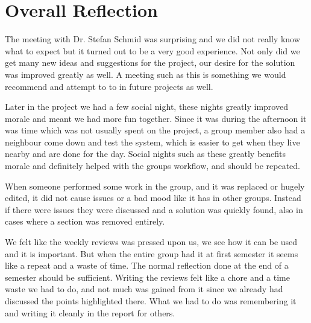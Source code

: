\section{Overall Reflection}
The meeting with Dr. Stefan Schmid was surprising and we did
not really know what to expect but it turned out to be a very good experience. Not only
did we get many new ideas and suggestions for the project, our desire for the
solution was improved greatly as well. A meeting such as this is something we
would recommend and attempt to to in future projects as well.

Later in the project we had a few social night, these nights greatly improved
morale and meant we had more fun together. Since it was during the afternoon it
was time which was not usually spent on the project, a group member also had a
neighbour come down and test the system, which is easier to get when they live
nearby and are done for the day. Social nights such as these greatly benefits
morale and definitely helped with the groups workflow, and should be repeated. 

When someone performed some work in the group, and it was replaced or hugely
edited, it did not cause issues or a bad mood like it has in other groups.
Instead if there were issues they were discussed and a solution was quickly
found, also in cases where a section was removed entirely. 

We felt like the weekly reviews was pressed upon us, we see how it can be used
and it is important. But when the entire group had it at first semester it seems
like a repeat and a waste of time. The normal reflection done at the end of a
semester should be sufficient. Writing the reviews felt like a chore and a time
waste we had to do, and not much was gained from it since we already had
discussed the points highlighted there. What we had to do was remembering it and
writing it cleanly in the report for others.